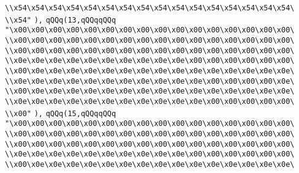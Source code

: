 \verb|\\x54\x54\x54\x54\x54\x54\x54\x54\x54\x54\x54\x54\x54\x54\x54\x54\|\newline
\verb|\\x54"|\newline
\verb|),|\newline
\verb|qQQq(13,qQQqqQQq|\newline
\verb|"\x00\x00\x00\x00\x00\x00\x00\x00\x00\x00\x00\x00\x00\x00\x00\x00\|\newline
\verb|\\x00\x00\x00\x00\x00\x00\x00\x00\x00\x00\x00\x00\x00\x00\x00\x00\|\newline
\verb|\\x00\x00\x00\x00\x00\x00\x00\x00\x00\x00\x00\x00\x00\x00\x00\x00\|\newline
\verb|\\x0e\x0e\x0e\x0e\x0e\x0e\x0e\x0e\x0e\x0e\x00\x00\x00\x00\x00\x00\|\newline
\verb|\\x00\x0e\x0e\x0e\x0e\x0e\x0e\x0e\x0e\x0e\x0e\x0e\x0e\x0e\x0e\x0e\|\newline
\verb|\\x0e\x0e\x0e\x0e\x0e\x0e\x0e\x0e\x0e\x0e\x0e\x00\x00\x00\x00\x0e\|\newline
\verb|\\x00\x0e\x0e\x0e\x0e\x0e\x0e\x0e\x0e\x0e\x0e\x0e\x0e\x0e\x0e\x0e\|\newline
\verb|\\x0e\x0e\x0e\x0e\x0e\x0e\x0e\x0e\x0e\x0e\x0e\x00\x00\x00\x00\x00\|\newline
\verb|\\x00"|\newline
\verb|),|\newline
\verb|qQQq(15,qQQqqQQq|\newline
\verb|"\x00\x00\x00\x00\x00\x00\x00\x00\x00\x00\x00\x00\x00\x00\x00\x00\|\newline
\verb|\\x00\x00\x00\x00\x00\x00\x00\x00\x00\x00\x00\x00\x00\x00\x00\x00\|\newline
\verb|\\x00\x00\x00\x00\x00\x00\x00\x00\x00\x00\x00\x00\x00\x00\x00\x00\|\newline
\verb|\\x0e\x0e\x0e\x0e\x0e\x0e\x0e\x0e\x0e\x0e\x00\x00\x00\x00\x00\x00\|\newline
\verb|\\x00\x0e\x0e\x0e\x0e\x0e\x0e\x0e\x0e\x0e\x0e\x0e\x0e\x0e\x0e\x0e\|\newline

